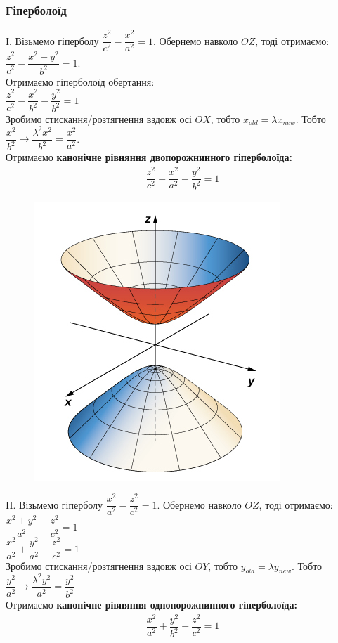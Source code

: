 \documentclass[a4paper, 10pt]{extarticle}
\theoremstyle{theoremdd}
\theoremstyle{theoremdd}
\theoremstyle{theoremdd}
\theoremstyle{theoremdd}
\theoremstyle{theoremdd}
\theoremstyle{theoremdd}
\theoremstyle{theoremdd}
\theoremstyle{theoremdd}
\begin{document}
\subsubsection{Гіперболоїд}
I. Візьмемо гіперболу $\dfrac{z^2}{c^2} - \dfrac{x^2}{a^2} = 1$. Обернемо навколо $OZ$, тоді отримаємо:\\
$\dfrac{z^2}{c^2} - \dfrac{x^2+y^2}{b^2} = 1$.\\
Отримаємо гіперболоїд обертання:\\
$\dfrac{z^2}{c^2} - \dfrac{x^2}{b^2} - \dfrac{y^2}{b^2} = 1$\\
Зробимо стискання/розтягнення вздовж осі $OX$, тобто $x_{old} = \lambda x_{new}$. Тобто $\dfrac{x^2}{b^2} \to \dfrac{\lambda^2 x^2}{b^2} = \dfrac{x^2}{a^2}$.\\
Отримаємо \textbf{канонічне рівняння двопорожнинного гіперболоїда:}
\begin{align*}
\dfrac{z^2}{c^2} - \dfrac{x^2}{a^2} - \dfrac{y^2}{b^2} = 1
\end{align*}
\begin{figure}[H]
\centering
\includegraphics[scale=1]{2-shit-hyperboloid.jpeg}
\end{figure}

II. Візьмемо гіперболу $\dfrac{x^2}{a^2} - \dfrac{z^2}{c^2} = 1$. Обернемо навколо $OZ$, тоді отримаємо:\\
$\dfrac{x^2+y^2}{a^2} - \dfrac{z^2}{c^2} = 1$\\
$\dfrac{x^2}{a^2} + \dfrac{y^2}{a^2} - \dfrac{z^2}{c^2} = 1$\\
Зробимо стискання/розтягнення вздовж осі $OY$, тобто $y_{old} = \lambda y_{new}$. Тобто $\dfrac{y^2}{a^2} \to \dfrac{\lambda^2 y^2}{a^2} = \dfrac{y^2}{b^2}$\\
Отримаємо \textbf{канонічне рівняння однопорожнинного гіперболоїда:}
\begin{align*}
\dfrac{x^2}{a^2} + \dfrac{y^2}{b^2} - \dfrac{z^2}{c^2} = 1
\end{align*}
\end{document}
